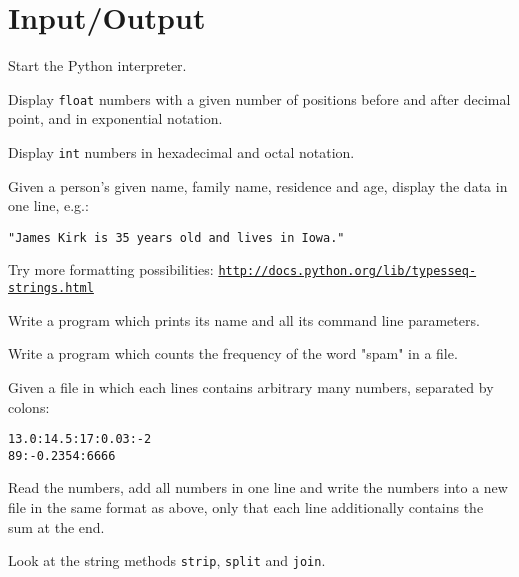\newpage

\section*{Input/Output}
\begin{aufgabe}
Start the Python interpreter.
\begin{auflistung}
\item Display \lstinline{float} numbers with a given number of positions before and after decimal point, and in exponential notation.
\item Display \lstinline{int} numbers in hexadecimal and octal notation.
\item Given a person's given name, family name, residence and age, display the data in one line, e.g.:
\begin{verbatim}
"James Kirk is 35 years old and lives in Iowa."
\end{verbatim}
\item Try more formatting possibilities: \texttt{\underline{http://docs.python.org/lib/typesseq-strings.html}}
\end{auflistung}
\end{aufgabe}

\begin{aufgabe}
Write a program which prints its name and all its command line parameters.
\end{aufgabe}

\begin{aufgabe}
Write a program which counts the frequency of the word "spam" in a file.
\end{aufgabe}

\begin{aufgabe}
Given a file in which each lines contains arbitrary many numbers, separated by colons:
\begin{verbatim}
13.0:14.5:17:0.03:-2
89:-0.2354:6666
\end{verbatim}
Read the numbers, add all numbers in one line and write the numbers into a new file in the same format as above, only that each line additionally contains the sum at the end.

\hinweis Look at the string methods \lstinline{strip}, \lstinline{split} and \lstinline{join}.
\end{aufgabe}


